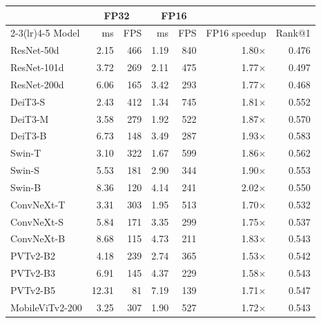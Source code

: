 \begin{tabular*}{\linewidth}{@{\extracolsep{\fill}} l r r r r r r}
\toprule
 & \multicolumn{2}{c}{FP32} & \multicolumn{2}{c}{FP16} & & \\
\cmidrule(lr){2-3}\cmidrule(lr){4-5}
Model & ms & FPS & ms & FPS & FP16 speedup & Rank@1 \\
\midrule
ResNet-50d & 2.15 & 466 & 1.19 & 840 & 1.80$\times$ & 0.476 \\
ResNet-101d & 3.72 & 269 & 2.11 & 475 & 1.77$\times$ & 0.497 \\
ResNet-200d & 6.06 & 165 & 3.42 & 293 & 1.77$\times$ & 0.468 \\
\addlinespace[2pt]
DeiT3-S & 2.43 & 412 & 1.34 & 745 & 1.81$\times$ & 0.552 \\
DeiT3-M & 3.58 & 279 & 1.92 & 522 & 1.87$\times$ & 0.570 \\
DeiT3-B & 6.73 & 148 & 3.49 & 287 & 1.93$\times$ & 0.583 \\
\addlinespace[2pt]
Swin-T & 3.10 & 322 & 1.67 & 599 & 1.86$\times$ & 0.562 \\
Swin-S & 5.53 & 181 & 2.90 & 344 & 1.90$\times$ & 0.553 \\
Swin-B & 8.36 & 120 & 4.14 & 241 & 2.02$\times$ & 0.550 \\
\addlinespace[2pt]
ConvNeXt-T & 3.31 & 303 & 1.95 & 513 & 1.70$\times$ & 0.532 \\
ConvNeXt-S & 5.84 & 171 & 3.35 & 299 & 1.75$\times$ & 0.537 \\
ConvNeXt-B & 8.68 & 115 & 4.73 & 211 & 1.83$\times$ & 0.543 \\
\addlinespace[2pt]
PVTv2-B2 & 4.18 & 239 & 2.74 & 365 & 1.53$\times$ & 0.542 \\
PVTv2-B3 & 6.91 & 145 & 4.37 & 229 & 1.58$\times$ & 0.543 \\
PVTv2-B5 & 12.31 & 81 & 7.19 & 139 & 1.71$\times$ & 0.547 \\
\addlinespace[2pt]
MobileViTv2-200 & 3.25 & 307 & 1.90 & 527 & 1.72$\times$ & 0.543 \\
\bottomrule
\end{tabular*}
